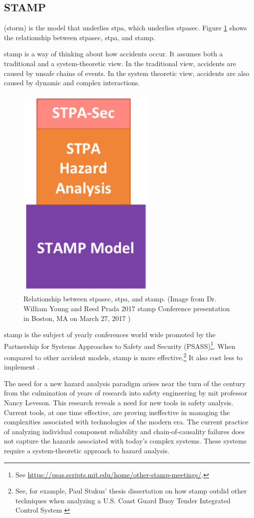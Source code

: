 \documentclass[../../main/main.tex]{subfiles}
\begin{document}
\subsection{STAMP}\label{ssec:stamp}
 (\gls{storm}) is the model that underlies \gls{stpa}, which underlies \gls{stpasec}.  Figure \ref{stampstpa} shows the relationship between \gls{stpasec}, \gls{stpa}, and \gls{stamp}.


\gls{stamp} is a way of thinking about how accidents occur.  It assumes both a traditional and a system-theoretic view.  In the traditional view, accidents are caused by unsafe chains of events.  In the system theoretic view, accidents are also caused by dynamic and complex interactions. 


\begin{figure}[h!]
\centering
\includegraphics[width=0.3\linewidth]{../figures/stampstpa}
\caption{\label{stampstpa}Relationship between \gls{stpasec}, \gls{stpa}, and \gls{stamp}. (Image from Dr. William Young and Reed Prada 2017 \gls{stamp} Conference presentation in Boston, MA on March 27, 2017 \cite{youngPorada})}
\end{figure}

\gls{stamp} is the subject of yearly conferences world wide promoted by the Partnership for Systems Approaches to Safety and Security (PSASS)\footnote{See \url{https://psas.scripts.mit.edu/home/other-stamp-meetings/}.}.  When compared to other accident models, \gls{stamp} is more effective.\footnote{See, for example, Paul Stukus' thesis dissertation on how \gls{stamp} outdid other techniques when analyzing a U.S. Coast Guard Buoy Tender Integrated Control System \cite{buoy}} It also cost less to implement \cite{stpa}.

The need for a new hazard analysis paradigm arises near the turn of the century from the culmination of years of research into safety engineering by \gls{mit} professor Nancy Leveson.  This research reveals a need for new tools in safety analysis.  Current tools, at one time effective, are proving ineffective in managing the complexities associated with technologies of the modern era.  The current practice of analyzing individual component reliability and chain-of-causality failures does not capture the hazards associated with today's complex systems.  These systems require a system-theoretic approach to hazard analysis. 
\end{document}
